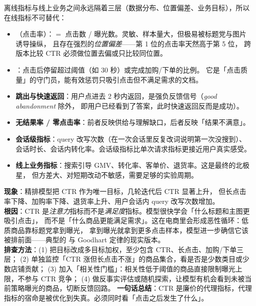 离线指标与线上业务之间永远隔着三层（数据分布、位置偏差、业务目标），所以在线指标不可替代：

\begin{itemize}
  \item {}（点击率）：$=$ 点击数 / 曝光数。灵敏、样本量大，但极易被标题党与图片诱导操纵，
        且存在强烈的\emph{位置偏差}\cite{varian2007position}——第 1 位的点击率天然高于第 5 位，
        跨版本比较 CTR 必须做位置去偏或只比较同位置。
  \item {}：点击后停留超过阈值（如 30 秒）或完成加购/下单的比例。
        它是「点击质量」的守门员，能有效惩罚只吸引点击但不满足需求的文档。
  \item \textbf{跳出与快速返回}：用户点进去 2 秒内返回，是强负反馈信号（\emph{good abandonment} 除外，
        即用户已经看到了答案，此时快速返回反而是成功）。
  \item \textbf{无结果率 / 零点击率}：前者反映供给与理解缺口，后者反映「结果不满意」。
  \item \textbf{会话级指标}：query 改写次数（在一次会话里反复改词说明第一次没搜到）、
        会话时长、会话内转化率。会话级指标比单次请求指标更接近用户真实感受。
  \item \textbf{线上业务指标}：搜索引导 GMV、转化率、客单价、退货率。这是最终的北极星，
        但方差大、对短期改动不敏感，需要足够的实验周期。
\end{itemize}

\begin{pitfall}
\textbf{现象}：精排模型把 CTR 作为唯一目标，几轮迭代后 CTR 显著上升，
但长点击率下降、加购率下降、退货率上升、用户会话内 query 改写次数增加。\\
\textbf{根因}：CTR 是\emph{注意力}指标而不是\emph{满足度}指标。模型很快学会「什么标题和主图更吸引点击」，
而不是「什么商品更能满足需求」。这在电商里会形成恶性循环：低质商品靠标题党拿到曝光，
拿到曝光就拿到更多点击样本，模型进一步确信它该被排前面——典型的
与 Goodhart 定律的现实版本\cite{goodhart1975}。\\
\textbf{排查方法}：(1) 把目标改成多目标加权，至少包含 CTR、长点击、加购/下单三层；
(2) 单独监控「CTR 涨但长点击不涨」的商品集合，看是否是少数类目或少数店铺贡献；
(3) 加入「相关性门槛」：相关性低于阈值的商品直接限制曝光上限，不参与 CTR 竞争；
(4) 做反事实评估或随机探索，让模型有机会看到未被当前策略曝光的商品，切断反馈回路。
\textbf{一句话总结}：CTR 是廉价的代理指标，代理指标的宿命是被优化到失真。必须同时看「点击之后发生了什么」。
\end{pitfall}

